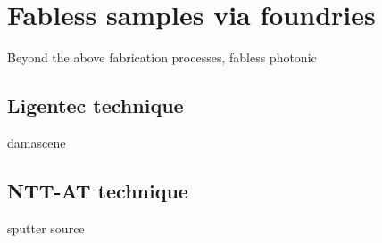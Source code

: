 \section{Fabless samples via foundries}

\cite{Hochberg2010}
Beyond the above fabrication processes, fabless photonic 





\subsection{Ligentec technique}
damascene

\subsection{NTT-AT technique}
sputter source
